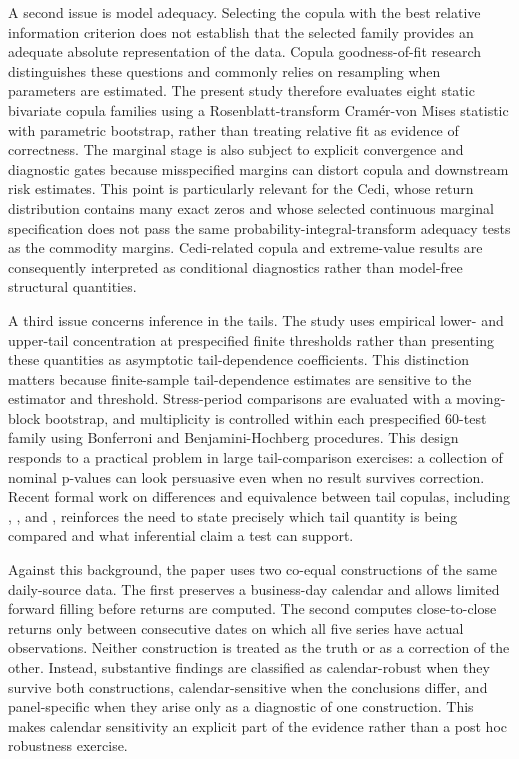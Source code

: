A second issue is model adequacy. Selecting the copula with the best relative information criterion does not establish that the selected family provides an adequate absolute representation of the data. Copula goodness-of-fit research distinguishes these questions and commonly relies on resampling when parameters are estimated. The present study therefore evaluates eight static bivariate copula families using a Rosenblatt-transform Cramér-von Mises statistic with parametric bootstrap, rather than treating relative fit as evidence of correctness. The marginal stage is also subject to explicit convergence and diagnostic gates because misspecified margins can distort copula and downstream risk estimates. This point is particularly relevant for the Cedi, whose return distribution contains many exact zeros and whose selected continuous marginal specification does not pass the same probability-integral-transform adequacy tests as the commodity margins. Cedi-related copula and extreme-value results are consequently interpreted as conditional diagnostics rather than model-free structural quantities.

A third issue concerns inference in the tails. The study uses empirical lower- and upper-tail concentration at prespecified finite thresholds rather than presenting these quantities as asymptotic tail-dependence coefficients. This distinction matters because finite-sample tail-dependence estimates are sensitive to the estimator and threshold. Stress-period comparisons are evaluated with a moving-block bootstrap, and multiplicity is controlled within each prespecified 60-test family using Bonferroni and Benjamini-Hochberg procedures. This design responds to a practical problem in large tail-comparison exercises: a collection of nominal p-values can look persuasive even when no result survives correction. Recent formal work on differences and equivalence between tail copulas, including \citet{bormann2020}, \citet{can2024}, and \citet{koike2025}, reinforces the need to state precisely which tail quantity is being compared and what inferential claim a test can support.

Against this background, the paper uses two co-equal constructions of the same daily-source data. The first preserves a business-day calendar and allows limited forward filling before returns are computed. The second computes close-to-close returns only between consecutive dates on which all five series have actual observations. Neither construction is treated as the truth or as a correction of the other. Instead, substantive findings are classified as calendar-robust when they survive both constructions, calendar-sensitive when the conclusions differ, and panel-specific when they arise only as a diagnostic of one construction. This makes calendar sensitivity an explicit part of the evidence rather than a post hoc robustness exercise.

